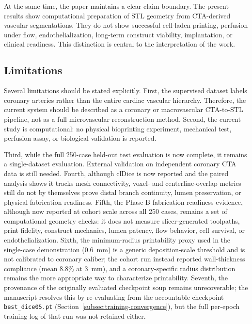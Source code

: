 \documentclass[anonymous]{iopjournal}
\begin{document}
At the same time, the paper maintains a clear claim boundary. The present results show computational preparation of STL geometry from CTA-derived vascular segmentations. They do not show successful cell-laden printing, perfusion under flow, endothelialization, long-term construct viability, implantation, or clinical readiness. This distinction is central to the interpretation of the work.

\subsection{Limitations}

Several limitations should be stated explicitly. First, the supervised dataset labels coronary arteries rather than the entire cardiac vascular hierarchy. Therefore, the current system should be described as a coronary or macrovascular CTA-to-STL pipeline, not as a full microvascular reconstruction method. Second, the current study is computational: no physical bioprinting experiment, mechanical test, perfusion assay, or biological validation is reported.

Third, while the full 250-case held-out test evaluation is now complete, it remains a single-dataset evaluation. External validation on independent coronary CTA data is still needed. Fourth, although clDice is now reported and the paired analysis shows it tracks mesh connectivity, voxel- and centerline-overlap metrics still do not by themselves prove distal branch continuity, lumen preservation, or physical fabrication readiness. Fifth, the Phase B fabrication-readiness evidence, although now reported at cohort scale across all 250 cases, remains a set of computational geometry checks: it does not measure slicer-generated toolpaths, print fidelity, construct mechanics, lumen patency, flow behavior, cell survival, or endothelialization. Sixth, the minimum-radius printability proxy used in the single-case demonstration (\SI{0.6}{mm}) is a generic deposition-scale threshold and is not calibrated to coronary caliber; the cohort run instead reported wall-thickness compliance (mean 8.8\% at \SI{3}{mm}), and a coronary-specific radius distribution remains the more appropriate way to characterize printability. Seventh, the provenance of the originally evaluated checkpoint soup remains unrecoverable; the manuscript resolves this by re-evaluating from the accountable checkpoint \texttt{best\_dice05.pt} (Section~\ref{subsec:training-convergence}), but the full per-epoch training log of that run was not retained either.
\end{document}
